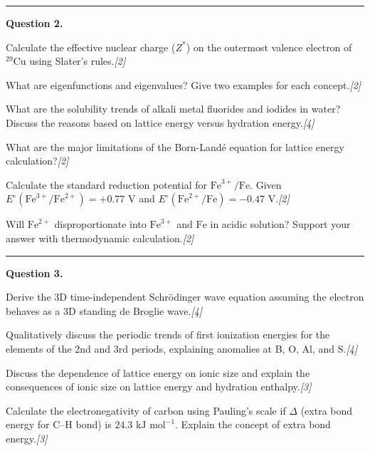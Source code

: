 \documentclass[11pt,a4paper]{article}
\newcommand{\pts}[1]{\hfill   \textit{[#1]}}
\begin{document}
\medskip\rule{\linewidth}{0.2pt}\medskip




\noindent   \textbf{Question 2.}

\begin{parts}
  \item Calculate the effective nuclear charge ($Z^*$) on the outermost valence electron of $^{29} \text{Cu}$ using Slater's rules.\pts{2}
  \item What are eigenfunctions and eigenvalues? Give two examples for each concept.\pts{2}
  \item What are the solubility trends of alkali metal fluorides and iodides in water? Discuss the reasons based on lattice energy versus hydration energy.\pts{4}
  \item What are the major limitations of the Born-Landé equation for lattice energy calculation?\pts{2}
  \item
  
\begin{parts}
    \item Calculate the standard reduction potential for $ \text{Fe}^{3+}/ \text{Fe}$. Given $E^\circ( \text{Fe}^{3+}/ \text{Fe}^{2+}) = +0.77  \text{ V}$ and $E^\circ( \text{Fe}^{2+}/ \text{Fe}) = -0.47  \text{ V}$.\pts{2}
    \item Will $ \text{Fe}^{2+}$ disproportionate into $ \text{Fe}^{3+}$ and $ \text{Fe}$ in acidic solution? Support your answer with thermodynamic calculation.\pts{2}
  \end{parts}
\end{parts}

\medskip\rule{\linewidth}{0.2pt}\medskip




\noindent   \textbf{Question 3.}

\begin{parts}
  \item Derive the 3D time-independent Schrödinger wave equation assuming the electron behaves as a 3D standing de Broglie wave.\pts{4}
  \item Qualitatively discuss the periodic trends of first ionization energies for the elements of the 2nd and 3rd periods, explaining anomalies at B, O, Al, and S.\pts{4}
  \item Discuss the dependence of lattice energy on ionic size and explain the consequences of ionic size on lattice energy and hydration enthalpy.\pts{3}
  \item Calculate the electronegativity of carbon using Pauling's scale if $\Delta$ (extra bond energy for C--H bond) is $24.3  \text{ kJ mol}^{-1}$. Explain the concept of extra bond energy.\pts{3}
\end{parts}
\end{document}
